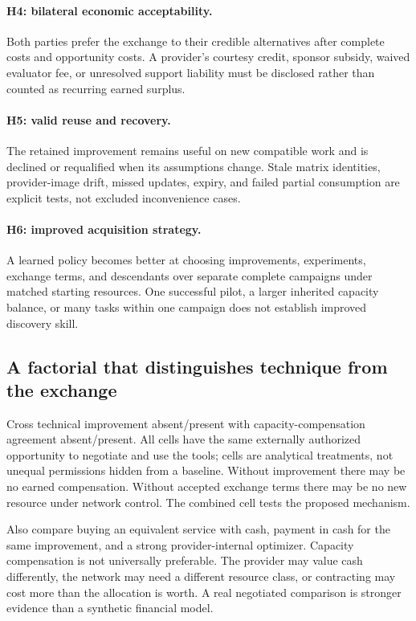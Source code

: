 \documentclass[11pt,letterpaper]{article}
\theoremstyle{remark}\newtheorem{remark}{Remark}[section]
\begin{document}
\paragraph{H4: bilateral economic acceptability.}
Both parties prefer the exchange to their credible alternatives after complete costs and opportunity costs. A provider's courtesy credit, sponsor subsidy, waived evaluator fee, or unresolved support liability must be disclosed rather than counted as recurring earned surplus.

\paragraph{H5: valid reuse and recovery.}
The retained improvement remains useful on new compatible work and is declined or requalified when its assumptions change. Stale matrix identities, provider-image drift, missed updates, expiry, and failed partial consumption are explicit tests, not excluded inconvenience cases.

\paragraph{H6: improved acquisition strategy.}
A learned policy becomes better at choosing improvements, experiments, exchange terms, and descendants over separate complete campaigns under matched starting resources. One successful pilot, a larger inherited capacity balance, or many tasks within one campaign does not establish improved discovery skill.

\subsection{A factorial that distinguishes technique from the exchange}
Cross technical improvement absent/present with capacity-compensation agreement absent/present. All cells have the same externally authorized opportunity to negotiate and use the tools; cells are analytical treatments, not unequal permissions hidden from a baseline. Without improvement there may be no earned compensation. Without accepted exchange terms there may be no new resource under network control. The combined cell tests the proposed mechanism.

Also compare buying an equivalent service with cash, payment in cash for the same improvement, and a strong provider-internal optimizer. Capacity compensation is not universally preferable. The provider may value cash differently, the network may need a different resource class, or contracting may cost more than the allocation is worth. A real negotiated comparison is stronger evidence than a synthetic financial model.
\end{document}
